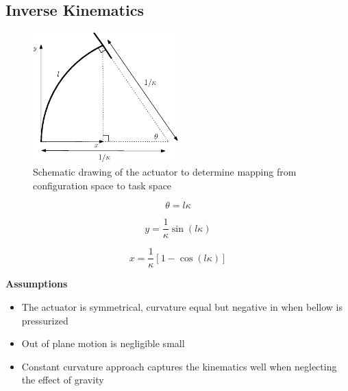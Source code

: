 \subsection{Inverse Kinematics}


\begin{figure}[H]
    \centering
    \includegraphics[width = 0.5\textwidth]{Figures/Chapter5/fbdkinematics.eps}
    \caption{Schematic drawing of the actuator to determine mapping from configuration space to task space}
    \label{fig:my_label}
\end{figure}


\begin{equation}
    \theta = l \kappa
\end{equation}


\begin{equation}
    y = \frac{1}{\kappa}\sin(l \kappa)
\end{equation}

\begin{equation}
    x = \frac{1}{\kappa}[1-\cos(l \kappa)]
\end{equation}





\textbf{Assumptions}
\begin{itemize}
    \item The actuator is symmetrical, curvature equal but negative in when bellow is pressurized
    \item Out of plane motion is negligible small
    \item Constant curvature approach captures the kinematics well when neglecting the effect of gravity 
\end{itemize}



